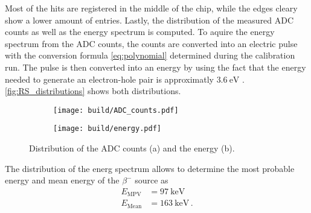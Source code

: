 Most of the hits are registered in the middle of the chip, while the
edges cleary show a lower amount of entries.
Lastly, the distribution of the measured ADC counts as well as the energy
spectrum is computed. To aquire the energy spectrum from the ADC counts, the
counts are converted into an electric pulse with the conversion formula \eqref{eq:polynomial} determined
during the calibration run. The pulse is then converted into an energy by
using the fact that the energy needed to generate an electron-hole pair is approximatly
$\qty{3.6}{\electronvolt}$ \cite{V15}. \autoref{fig:RS_distributions} shows
both distributions.

\begin{figure}[H]
  \centering
    \begin{subfigure}{0.45\textwidth}
      \texttt{[image: build/ADC\_counts.pdf]}
      \caption{}
    \end{subfigure}
    \begin{subfigure}{0.45\textwidth}
      \texttt{[image: build/energy.pdf]}
      \caption{}
    \end{subfigure}
  \caption{Distribution of the ADC counts (a) and the energy (b).}
  \label{fig:RS_distributions}
\end{figure}

The distribution of the energ spectrum allows to determine the most probable energy
and mean energy of the $\beta^-$ source as
\begin{align*}
  E_{\mathrm{MPV}} &= \qty{97}{\kilo\electronvolt} \\
  E_{\mathrm{Mean}} &= \qty{163}{\kilo\electronvolt} \, .
\end{align*}